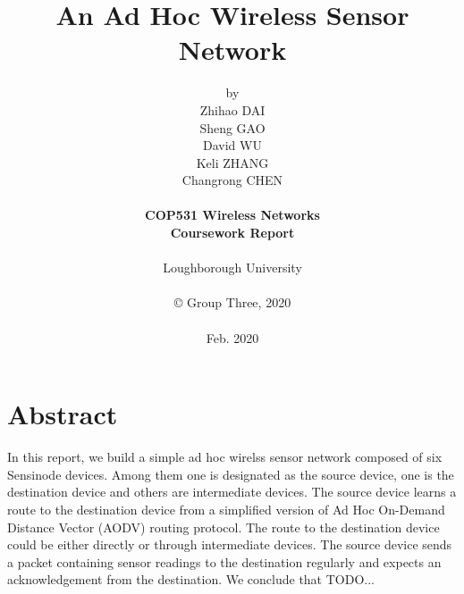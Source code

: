 \title{\bf An Ad Hoc Wireless Sensor Network}

\author{by\\
Zhihao DAI\\
Sheng GAO\\
David WU\\
Keli ZHANG\\
Changrong CHEN\\
\\
{\bf COP531 Wireless Networks}\\
{\bf Coursework Report}\\
\\
Loughborough University\\
\\
\copyright
\hspace{1 dd} Group Three, 2020\\
\\
Feb. 2020
}
\date{} %

\maketitle


% 
% 

\chapter*{Abstract}
In this report, we build a simple ad hoc wirelss sensor network composed of six Sensinode devices.
Among them one is designated as the source device, one is the destination device and others are intermediate devices.
The source device learns a route to the destination device from a simplified version of Ad Hoc On-Demand Distance Vector (AODV) routing protocol.
The route to the destination device could be either directly or through intermediate devices.
The source device sends a packet containing sensor readings to the destination regularly and expects an acknowledgement from the destination.
We conclude that TODO...

